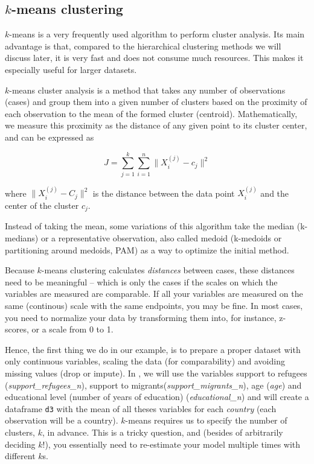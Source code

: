 \subsection{$k$-means clustering}

$k$-means is a very frequently used algorithm to perform cluster
analysis. Its main advantage is that, compared to the hierarchical
clustering methods we will discuss later, it is very fast and does not
consume much resources. This makes it especially useful for larger
datasets.

$k$-means cluster analysis is a method that takes any number of observations (cases) and group them into a given number of clusters based on the proximity of each observation to the mean of the formed cluster (centroid).  Mathematically, we measure this proximity as the distance of any given point to its cluster center, and can be expressed as

$$J = \sum_{j=1}^{k} \sum_{i=1}^{n} \big\| X_i^{(j)} - c_j \big\| ^2$$

where $ \big\| X_i^{(j)} - C_j \big\| ^2$ is the distance between the data point $X_i^{(j)}$ and the center of the cluster $c_j$.

Instead of taking the mean, some variations of this algorithm take the median (k-medians) or a representative observation, also called medoid (k-medoids or partitioning around medoids, PAM) as a way to optimize the initial method.

Because $k$-means clustering calculates \emph{distances} between cases,
these distances need to be meaningful -- which is only the cases if
the scales on which the variables are measured are comparable. If all
your variables are measured on the same (continous) scale with the
same endpoints, you may be fine. In most cases, you need to normalize
your data by transforming them into, for instance, z-scores, or a
scale from 0 to 1.

Hence, the first thing we do in our example, is to prepare a proper
dataset with only continuous variables, scaling the data (for
comparability) and avoiding missing values (drop or impute). In
, we will use the variables support to refugees
(\emph{support\_refugees\_n}), support to
migrants(\emph{support\_migrants\_n}), age (\emph{age}) and
educational level (number of years of education)
(\emph{educational\_n}) and will create a dataframe \verb+d3+ with the
mean of all theses variables for each \emph{country} (each observation
will be a country). $k$-means requires us to specify the number of
clusters, $k$, in advance. This is a tricky question, and (besides of
arbitrarily deciding $k$!), you essentially need to re-estimate your
model multiple times with different $k$s.

